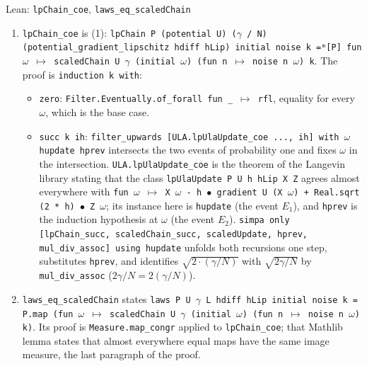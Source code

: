 \documentclass[11pt,a4paper]{article}
\begin{document}
\begin{leanbox}{Lean: \texttt{lpChain\_\allowbreak{}coe}, \texttt{laws\_\allowbreak{}eq\_\allowbreak{}scaledChain}}
\begin{enumerate}


\item \texttt{lp\allowbreak{}Chain\_\allowbreak{}coe} is (1): \texttt{lp\allowbreak{}Chain P (potential U) (\ensuremath{\gamma} /\allowbreak{} N) (potential\_\allowbreak{}gradient\_\allowbreak{}lipschitz hdiff h\allowbreak{}Lip) initial noise k =ᵐ[P] fun \ensuremath{\omega} \ensuremath{\mapsto} scaled\allowbreak{}Chain U \ensuremath{\gamma} (initial \ensuremath{\omega}) (fun n \ensuremath{\mapsto} noise n \ensuremath{\omega}) k}. The proof is \texttt{induction k with}:

\begin{itemize}


\item \texttt{zero}: \texttt{Filter.\allowbreak{}Eventually.\allowbreak{}of\_\allowbreak{}forall fun \_\allowbreak{} \ensuremath{\mapsto} rfl}, equality for every \(\omega\), which is the base case.

\item \texttt{succ k ih}: \texttt{filter\_\allowbreak{}upwards [ULA.\allowbreak{}lp\allowbreak{}Ula\allowbreak{}Update\_\allowbreak{}coe .\allowbreak{}.\allowbreak{}.\allowbreak{}, ih] with \ensuremath{\omega} hupdate hprev} intersects the two events of probability one and fixes \(\omega\) in the intersection. \texttt{ULA.\allowbreak{}lp\allowbreak{}Ula\allowbreak{}Update\_\allowbreak{}coe} is the theorem of the Langevin library stating that the class \texttt{lp\allowbreak{}Ula\allowbreak{}Update P U h h\allowbreak{}Lip X Z} agrees almost everywhere with \texttt{fun \ensuremath{\omega} \ensuremath{\mapsto} X \ensuremath{\omega} -\allowbreak{} h \ensuremath{\bullet} gradient U (X \ensuremath{\omega}) + Real.\allowbreak{}sqrt (2 * h) \ensuremath{\bullet} Z \ensuremath{\omega}}; its instance here is \texttt{hupdate} (the event \(E_1\)), and \texttt{hprev} is the induction hypothesis at \(\omega\) (the event \(E_2\)). \texttt{simpa only [lp\allowbreak{}Chain\_\allowbreak{}succ, scaled\allowbreak{}Chain\_\allowbreak{}succ, scaled\allowbreak{}Update, hprev, mul\_\allowbreak{}div\_\allowbreak{}assoc] using hupdate} unfolds both recursions one step, substitutes \texttt{hprev}, and identifies \(\sqrt{2\cdot(\gamma/N)}\) with \(\sqrt{2\gamma/N}\) by \texttt{mul\_\allowbreak{}div\_\allowbreak{}assoc} (\(2\gamma/N=2(\gamma/N)\)).

\end{itemize}


\item \texttt{laws\_\allowbreak{}eq\_\allowbreak{}scaled\allowbreak{}Chain} states \texttt{laws P U \ensuremath{\gamma} L hdiff h\allowbreak{}Lip initial noise k = P.\allowbreak{}map (fun \ensuremath{\omega} \ensuremath{\mapsto} scaled\allowbreak{}Chain U \ensuremath{\gamma} (initial \ensuremath{\omega}) (fun n \ensuremath{\mapsto} noise n \ensuremath{\omega}) k)}. Its proof is \texttt{Measure.\allowbreak{}map\_\allowbreak{}congr} applied to \texttt{lp\allowbreak{}Chain\_\allowbreak{}coe}; that Mathlib lemma states that almost everywhere equal maps have the same image measure, the last paragraph of the proof.


\end{enumerate}
\end{leanbox}
\end{document}
